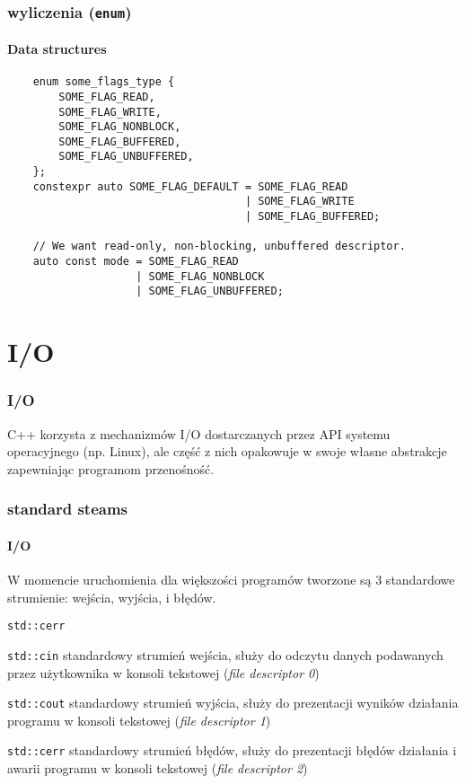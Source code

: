 \documentclass[aspectratio=169]{beamer}
\begin{document}
\begin{frame}[fragile]
    \frametitle{wyliczenia ({\tt enum})}
    \framesubtitle{Data structures}

    {\scriptsize
    \begin{lstlisting}
    enum some_flags_type {
        SOME_FLAG_READ,
        SOME_FLAG_WRITE,
        SOME_FLAG_NONBLOCK,
        SOME_FLAG_BUFFERED,
        SOME_FLAG_UNBUFFERED,
    };
    constexpr auto SOME_FLAG_DEFAULT = SOME_FLAG_READ
                                     | SOME_FLAG_WRITE
                                     | SOME_FLAG_BUFFERED;

    // We want read-only, non-blocking, unbuffered descriptor.
    auto const mode = SOME_FLAG_READ
                    | SOME_FLAG_NONBLOCK
                    | SOME_FLAG_UNBUFFERED;
    \end{lstlisting}}
\end{frame}

\section{I/O}

\begin{frame}
    \frametitle{I/O}

    C++ korzysta z mechanizmów I/O dostarczanych przez API systemu operacyjnego
    (np. Linux), ale część z nich opakowuje w swoje własne abstrakcje
    zapewniając programom przenośność.
\end{frame}

\begin{frame}
    \frametitle{standard steams}
    \framesubtitle{I/O}

    W momencie uruchomienia dla większości programów tworzone są 3 standardowe
    strumienie: wejścia, wyjścia, i błędów.

    \begin{labeling}{{\tt std::cerr}}
    \item[{\tt std::cin}] standardowy strumień wejścia, służy do odczytu danych
        podawanych przez użytkownika w konsoli tekstowej (\emph{file descriptor
        0})
    \item[{\tt std::cout}] standardowy strumień wyjścia, służy do prezentacji
        wyników działania programu w konsoli tekstowej (\emph{file descriptor
        1})
    \item[{\tt std::cerr}] standardowy strumień błędów, służy do prezentacji
        błędów działania i awarii programu w konsoli tekstowej (\emph{file
        descriptor 2})
    \end{labeling}
\end{frame}
\end{document}
